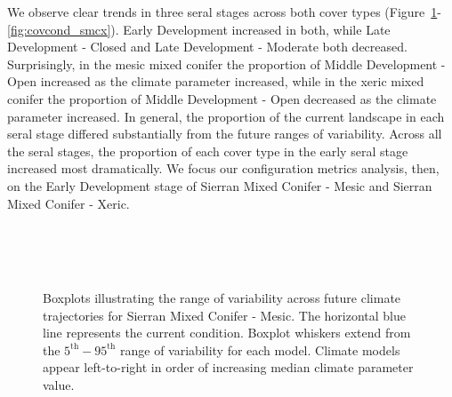 We observe clear trends in three seral stages across both cover types (Figure~\ref{fig:covcond_smcm}-\ref{fig:covcond_smcx}). Early Development increased in both, while Late Development - Closed and Late Development - Moderate both decreased. Surprisingly, in the mesic mixed conifer the proportion of Middle Development - Open increased as the climate parameter increased, while in the xeric mixed conifer the proportion of Middle Development - Open decreased as the climate parameter increased. In general, the proportion of the current landscape in each seral stage differed substantially from the future ranges of variability. Across all the seral stages, the proportion of each cover type in the early seral stage increased most dramatically. We focus our configuration metrics analysis, then, on the Early Development stage of Sierran Mixed Conifer - Mesic and Sierran Mixed Conifer - Xeric.



\begin{figure}[htbp]
  \centering
   \\
   \\
     \\
    \caption{Boxplots illustrating the range of variability across future climate trajectories for Sierran Mixed Conifer - Mesic. The horizontal blue line represents the current condition. Boxplot whiskers extend from the $5^{\text{th}} - 95^{\text{th}}$ range of variability for each model. Climate models appear left-to-right in order of increasing median climate parameter value.}
  \label{fig:covcond_smcm}
\end{figure} %

